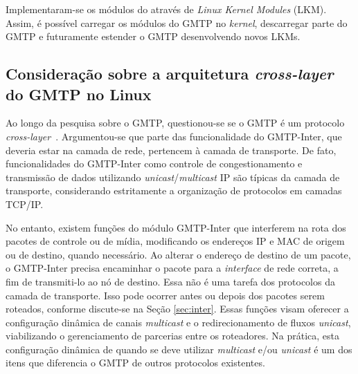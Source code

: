Implementaram-se os módulos do através de \textit{Linux Kernel Modules} (LKM). Assim, é possível carregar os módulos do GMTP no \textit{kernel}, descarregar parte do GMTP e futuramente estender o GMTP desenvolvendo novos LKMs. 


\subsection{Consideração sobre a arquitetura \textit{cross-layer} do GMTP no Linux}
Ao longo da pesquisa sobre o GMTP, questionou-se se o GMTP é um protocolo \textit{cross-layer}~\cite{1561928}.
Argumentou-se que parte das funcionalidade do GMTP-Inter, que deveria estar na camada de rede,  pertencem à camada de transporte. De fato, funcionalidades do GMTP-Inter como controle de congestionamento e transmissão de dados utilizando \textit{unicast}/\textit{multicast} IP são típicas da camada de transporte, considerando estritamente a organização de protocolos em camadas TCP/IP.

No entanto, existem funções do módulo GMTP-Inter que interferem na rota dos pacotes de controle ou de mídia, modificando os endereços IP e MAC de origem ou de destino, quando necessário. Ao alterar o endereço de destino de um pacote, o GMTP-Inter precisa encaminhar o pacote para a \textit{interface} de rede correta, a fim de transmiti-lo ao nó de destino. Essa não é uma tarefa dos protocolos da camada de transporte.
Isso pode ocorrer antes ou depois dos pacotes serem roteados, conforme discute-se na Seção \ref{sec:inter}.  
Essas funções visam oferecer a configuração dinâmica de canais \textit{multicast}
e o redirecionamento de fluxos \textit{unicast}, viabilizando o gerenciamento de parcerias entre os roteadores.
Na prática, esta configuração dinâmica de quando se deve utilizar \textit{multicast} e/ou \textit{unicast} é um dos itens que diferencia o GMTP de outros protocolos existentes.

